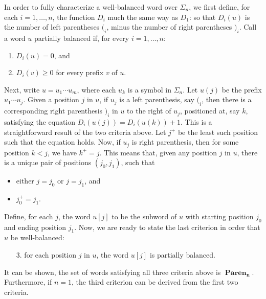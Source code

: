 \documentclass[12pt]{article}
\begin{document}
In order to fully characterize a well-balanced word over $\Sigma_n$, we first define, for each $i=1,\ldots, n$, the function $D_i$ much the same way as $D_1$: so that $D_i(u)$ is the number of left parentheses $(_i$, minus the number of right parentheses $)_i$.  Call a word $u$ partially balanced if, for every $i=1,\ldots, n$:
\begin{enumerate}
\item $D_i(u)=0$, and
\item $D_i(v)\ge 0$ for every prefix $v$ of $u$.
\end{enumerate}
Next, write $u=u_1 \cdots u_m$, where each $u_k$ is a symbol in $\Sigma_n$.  Let $u(j)$ be the prefix $u_1 \cdots u_j$.  Given a position $j$ in $u$, if $u_j$ is a left parenthesis, say $(_i$, then there is a corresponding right parenthesis $)_i$ in $u$ to the right of $u_j$, positioned at, say $k$, satisfying the equation $D_i(u(j))=D_i(u(k))+1$.  This is a straightforward result of the two criteria above.  Let $j^+$ be the least such position such that the equation holds.  Now, if $u_j$ is  right parenthesis, then for some position $k<j$, we have $k^+=j$.  This means that, given any position $j$ in $u$, there is a unique pair of positions $(j_0,j_1)$, such that
\begin{itemize}
\item either $j=j_0$ or $j=j_1$, and
\item $j_0^+ = j_1$.
\end{itemize}
Define, for each $j$, the word $u[j]$ to be the subword of $u$ with starting position $j_0$ and ending position $j_1$.  Now, we are ready to state the last criterion in order that $u$ be well-balanced:
\begin{enumerate}
\item[3.] for each position $j$ in $u$, the word $u[j]$ is partially balanced.
\end{enumerate}
It can be shown, the set of words satisfying all three criteria above is $\boldsymbol{\operatorname{Paren}_n}$.  Furthermore, if $n=1$, the third criterion can be derived from the first two criteria.
\end{document}
